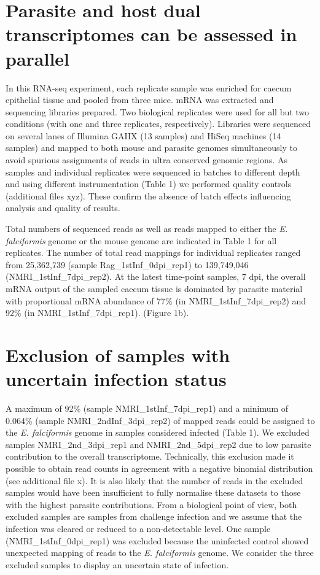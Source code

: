 \documentclass{bmcart}
\begin{document}
\section*{Parasite and host dual transcriptomes can be assessed in parallel}
In this RNA-seq experiment, each replicate sample was enriched for caecum epithelial tissue and pooled 
from three mice. mRNA was extracted and sequencing libraries prepared. Two biological replicates were used for all but two conditions (with one and three replicates, respectively). Libraries were sequenced on several lanes of Illumina GAIIX (13 samples) and HiSeq machines (14 samples) and mapped to both mouse and parasite genomes simultaneously to avoid spurious assignments of reads in ultra conserved genomic regions. As samples and individual replicates were sequenced in batches to different depth and using different instrumentation (Table 1) we performed quality controls (additional files xyz). These confirm the absence of batch effects influencing analysis and quality of results. 

Total numbers of sequenced reads as well as reads mapped to either the \textit{E. falciformis} genome or the mouse genome are indicated in Table 1 for all replicates. The number of total read mappings for individual replicates ranged from 25,362,739 (sample Rag\_1stInf\_0dpi\_rep1) to 139,749,046 (NMRI\_1stInf\_7dpi\_rep2). At the latest time-point samples, 7 dpi, the overall mRNA output of the sampled caecum tissue is dominated by parasite material with proportional mRNA abundance of 77\% (in NMRI\_1stInf\_7dpi\_rep2) and 92\% (in NMRI\_1stInf\_7dpi\_rep1). (Figure 1b). 

\section*{Exclusion of samples with uncertain infection status}
A maximum of 92\% (sample NMRI\_1stInf\_7dpi\_rep1) and a minimum of 0.064\% (sample NMRI\_2ndInf\_3dpi\_rep2) of mapped reads could be assigned to the \textit{E. falciformis} genome in samples considered infected (Table 1). We excluded samples NMRI\_2nd\_3dpi\_rep1 and NMRI\_2nd\_5dpi\_rep2 due to low parasite contribution to the overall transcriptome. Technically, this exclusion made it possible to obtain read counts in agreement with a negative binomial distribution (see additional file x). It is also likely that the number of reads in the excluded samples would have been insufficient to fully normalise these datasets to those with the highest parasite contributions. From a biological point of view, both excluded samples are samples from challenge infection and we assume that the infection was cleared or reduced to a non-detectable level. One sample (NMRI\_1stInf\_0dpi\_rep1) was excluded because the uninfected control showed unexpected mapping of reads to the \textit{E. falciformis} genome. We consider the three excluded samples to display an uncertain state of infection.
\end{document}
